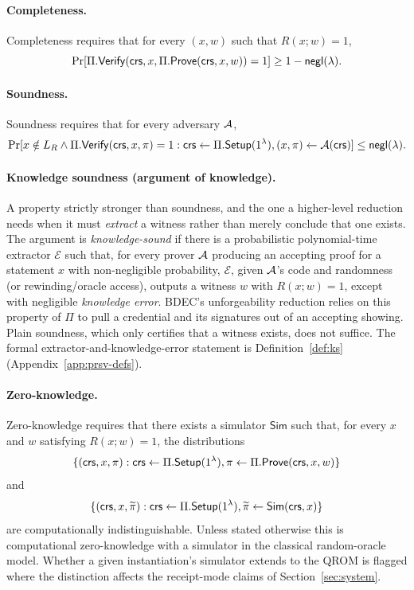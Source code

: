 \paragraph{Completeness.}
Completeness requires that for every $(x,w)$ such that $R(x;w)=1$,
\begin{equation*}
  \Pr[\Pi.\mathsf{Verify}(\mathsf{crs},x,\Pi.\mathsf{Prove}(\mathsf{crs},x,w))=1]\geq 1-\mathsf{negl}(\lambda).
\end{equation*}

\paragraph{Soundness.}
Soundness requires that for every adversary $\mathcal{A}$,
\begin{equation*}
  \Pr[
  x\notin L_R \land \Pi.\mathsf{Verify}(\mathsf{crs},x,\pi)=1
  :
  \mathsf{crs}\leftarrow\Pi.\mathsf{Setup}(1^\lambda),
  (x,\pi)\leftarrow\mathcal{A}(\mathsf{crs})
  ]\leq \mathsf{negl}(\lambda).
\end{equation*}

\paragraph{Knowledge soundness (argument of knowledge).}
A property strictly stronger than soundness, and the one a higher-level reduction needs when it must \emph{extract} a witness rather than merely conclude that one exists. The argument is \emph{knowledge-sound} if there is a probabilistic polynomial-time extractor $\mathcal{E}$ such that, for every prover $\mathcal{A}$ producing an accepting proof for a statement $x$ with non-negligible probability, $\mathcal{E}$, given $\mathcal{A}$'s code and randomness (or rewinding/oracle access), outputs a witness $w$ with $R(x;w)=1$, except with negligible \emph{knowledge error}. BDEC's unforgeability reduction relies on this property of $\Pi$ to pull a credential and its signatures out of an accepting showing. Plain soundness, which only certifies that a witness exists, does not suffice. The formal extractor-and-knowledge-error statement is Definition~\ref{def:ks} (Appendix~\ref{app:prsv-defs}).

\paragraph{Zero-knowledge.}
Zero-knowledge requires that there exists a simulator $\mathsf{Sim}$ such that, for every $x$ and $w$ satisfying $R(x;w)=1$, the distributions
\begin{equation*}
  \{(\mathsf{crs},x,\pi):\mathsf{crs}\leftarrow\Pi.\mathsf{Setup}(1^\lambda),
  \pi\leftarrow\Pi.\mathsf{Prove}(\mathsf{crs},x,w)\}
\end{equation*}
and
\begin{equation*}
  \{(\mathsf{crs},x,\widetilde\pi):\mathsf{crs}\leftarrow\Pi.\mathsf{Setup}(1^\lambda),
  \widetilde\pi\leftarrow\mathsf{Sim}(\mathsf{crs},x)\}
\end{equation*}
are computationally indistinguishable. Unless stated otherwise this is computational zero-knowledge with a simulator in the classical random-oracle model. Whether a given instantiation's simulator extends to the QROM is flagged where the distinction affects the receipt-mode claims of Section~\ref{sec:system}.

